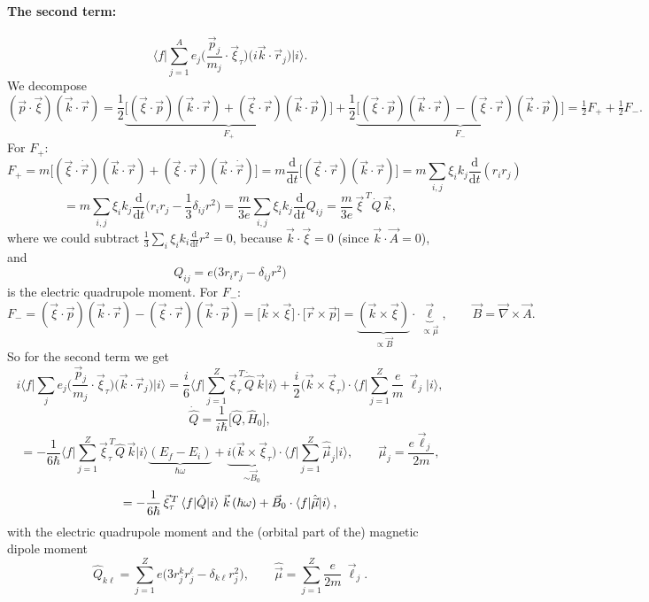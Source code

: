 \documentclass[11pt,a4paper]{article}
\newcommand{\op}[1]{\hat{#1}}
\newcommand{\ud}{\mathrm{d}}
\begin{document}
\paragraph{The second term:}
\[
\Big\langle f\Big|\sum_{j=1}^Ae_j\Big(\frac{\vec p_j}{m_j}\cdot\vec\xi_\tau\Big)\big(i\vec k\cdot\vec r_j\big)\Big|i\Big\rangle .
\]
We decompose
\[
(\vec p\cdot\vec\xi)(\vec k\cdot\vec r)
=\frac12\underbrace{\big[(\vec\xi\cdot\vec p)(\vec k\cdot\vec r)+(\vec\xi\cdot\vec r)(\vec k\cdot\vec p)\big]}_{F_+}
+\frac12\underbrace{\big[(\vec\xi\cdot\vec p)(\vec k\cdot\vec r)-(\vec\xi\cdot\vec r)(\vec k\cdot\vec p)\big]}_{F_-}
=\tfrac12F_++\tfrac12F_- .
\]
For $F_+$:
\[
F_+=m\big[(\vec\xi\cdot\dot{\vec r})(\vec k\cdot\vec r)+(\vec\xi\cdot\vec r)(\vec k\cdot\dot{\vec r})\big]
=m\frac{\ud}{\ud t}\big[(\vec\xi\cdot\vec r)(\vec k\cdot\vec r)\big]
=m\sum_{i,j}\xi_ik_j\frac{\ud}{\ud t}(r_ir_j)
\]
\[
=m\sum_{i,j}\xi_ik_j\frac{\ud}{\ud t}\Big(r_ir_j-\frac13\delta_{ij}r^2\Big)
=\frac{m}{3e}\sum_{i,j}\xi_ik_j\frac{\ud}{\ud t}Q_{ij}
=\frac{m}{3e}\,\vec\xi^{\,T}\dot Q\,\vec k ,
\]
where we could subtract $\frac13\sum_i\xi_ik_i\frac{\ud}{\ud t}r^2=0$, because $\vec k\cdot\vec\xi=0$ (since $\vec k\cdot\vec A=0$), and
\[
Q_{ij}=e\big(3r_ir_j-\delta_{ij}r^2\big)
\]
is the electric quadrupole moment. For $F_-$:
\[
F_-=(\vec\xi\cdot\vec p)(\vec k\cdot\vec r)-(\vec\xi\cdot\vec r)(\vec k\cdot\vec p)
=\big[\vec k\times\vec\xi\big]\cdot\big[\vec r\times\vec p\big]
=\underbrace{(\vec k\times\vec\xi)}_{\propto\vec B}\cdot\underbrace{\vec\ell}_{\propto\vec\mu},
\qquad \vec B=\vec\nabla\times\vec A .
\]
So for the second term we get
\[
i\Big\langle f\Big|\sum_je_j\Big(\frac{\vec p_j}{m_j}\cdot\vec\xi_\tau\Big)\big(\vec k\cdot\vec r_j\big)\Big|i\Big\rangle
=\frac i6\Big\langle f\Big|\sum_{j=1}^Z\vec\xi^{\,T}_\tau\dot{\op Q}\,\vec k\Big|i\Big\rangle
+\frac i2\big(\vec k\times\vec\xi_\tau\big)\cdot\Big\langle f\Big|\sum_{j=1}^Z\frac em\,\vec\ell_j\Big|i\Big\rangle ,
\]
\[
\dot{\op Q}=\frac{1}{i\hbar}\big[\op Q,\op H_0\big],
\]
\[
=-\frac{1}{6\hbar}\Big\langle f\Big|\sum_{j=1}^Z\vec\xi^{\,T}_\tau\op Q\,\vec k\Big|i\Big\rangle\underbrace{(E_f-E_i)}_{\hbar\omega}
+\underbrace{i\big(\vec k\times\vec\xi_\tau\big)}_{\sim\vec B_0}\cdot\Big\langle f\Big|\sum_{j=1}^Z\op{\vec\mu}_j\Big|i\Big\rangle,
\qquad \vec\mu_j=\frac{e\vec\ell_j}{2m},
\]
\[
=-\frac{1}{6\hbar}\,\vec\xi^{\,T}_\tau\braket{f|\op Q|i}\,\vec k\,(\hbar\omega)+\vec B_0\cdot\braket{f|\op{\vec\mu}|i},
\]
with the electric quadrupole moment and the (orbital part of the) magnetic dipole moment
\[
\op Q_{k\ell}=\sum_{j=1}^Ze\big(3r^k_jr^\ell_j-\delta_{k\ell}r_j^2\big),
\qquad
\op{\vec\mu}=\sum_{j=1}^Z\frac{e}{2m}\,\vec\ell_j .
\]
\end{document}
